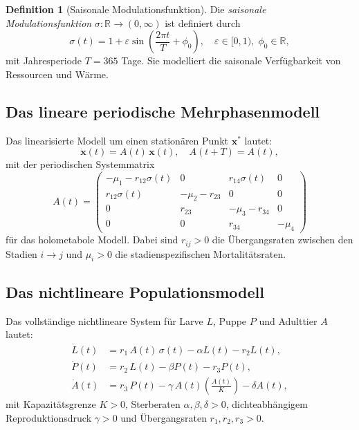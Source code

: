 ﻿\documentclass[12pt, a4paper]{article}
\theoremstyle{definition}
\newtheorem{definition}[theorem]{Definition}
\newcommand{\R}{\mathbb{R}}
\begin{document}
\begin{definition}[Saisonale Modulationsfunktion]\label{def:modulation}
Die \emph{saisonale Modulationsfunktion} $\sigma: \R \to (0, \infty)$ ist definiert
durch
\[
  \sigma(t) = 1 + \varepsilon \sin\!\left(\frac{2\pi t}{T} + \phi_0\right),
  \quad \varepsilon \in [0, 1),\; \phi_0 \in \R,
\]
mit Jahresperiode $T = 365$ Tage. Sie modelliert die saisonale Verfügbarkeit von
Ressourcen und Wärme.
\end{definition}

\subsection{Das lineare periodische Mehrphasenmodell}

Das linearisierte Modell um einen stationären Punkt $\bm{x}^*$ lautet:
\begin{equation}\label{eq:linear-system}
  \dot{\bm{x}}(t) = A(t)\,\bm{x}(t), \quad A(t+T) = A(t),
\end{equation}
mit der periodischen Systemmatrix
\begin{equation}\label{eq:matrix-A}
A(t) = \begin{pmatrix}
  -\mu_1 - r_{12}\sigma(t) & 0 & r_{14}\sigma(t) & 0 \\
  r_{12}\sigma(t) & -\mu_2 - r_{23} & 0 & 0 \\
  0 & r_{23} & -\mu_3 - r_{34} & 0 \\
  0 & 0 & r_{34} & -\mu_4
\end{pmatrix}
\end{equation}
für das holometabole Modell. Dabei sind $r_{ij} > 0$ die Übergangsraten zwischen
den Stadien $i \to j$ und $\mu_i > 0$ die stadienspezifischen Mortalitätsraten.

\subsection{Das nichtlineare Populationsmodell}

Das vollständige nichtlineare System für Larve $L$, Puppe $P$ und Adulttier $A$
lautet:
\begin{subequations}\label{eq:nl-system}
\begin{align}
  \dot{L}(t) &= r_1\,A(t)\,\sigma(t) - \alpha L(t) - r_2 L(t), \label{eq:nl-L}\\
  \dot{P}(t) &= r_2\,L(t) - \beta P(t) - r_3 P(t), \label{eq:nl-P}\\
  \dot{A}(t) &= r_3\,P(t) - \gamma\,A(t)\!\left(\frac{A(t)}{K}\right) - \delta A(t), \label{eq:nl-A}
\end{align}
\end{subequations}
mit Kapazitätsgrenze $K > 0$, Sterberaten $\alpha, \beta, \delta > 0$,
dichteabhängigem Reproduktionsdruck $\gamma > 0$ und Übergangsraten
$r_1, r_2, r_3 > 0$.
\end{document}

